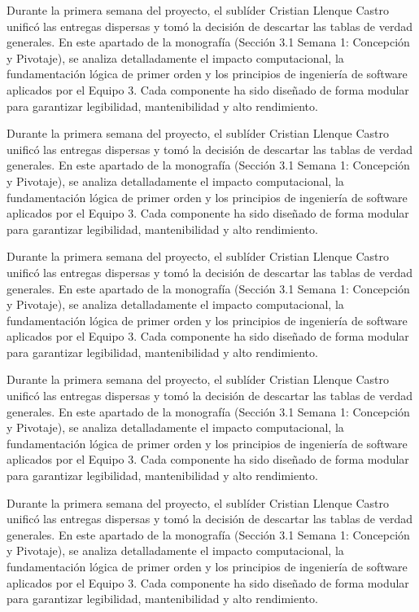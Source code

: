 \documentclass[11pt,a4paper]{article}
\begin{document}
Durante la primera semana del proyecto, el sublíder Cristian Llenque
Castro unificó las entregas dispersas y tomó la decisión de descartar
las tablas de verdad generales. En este apartado de la monografía
(Sección 3.1 Semana 1: Concepción y Pivotaje), se analiza detalladamente
el impacto computacional, la fundamentación lógica de primer orden y los
principios de ingeniería de software aplicados por el Equipo 3. Cada
componente ha sido diseñado de forma modular para garantizar
legibilidad, mantenibilidad y alto rendimiento.

Durante la primera semana del proyecto, el sublíder Cristian Llenque
Castro unificó las entregas dispersas y tomó la decisión de descartar
las tablas de verdad generales. En este apartado de la monografía
(Sección 3.1 Semana 1: Concepción y Pivotaje), se analiza detalladamente
el impacto computacional, la fundamentación lógica de primer orden y los
principios de ingeniería de software aplicados por el Equipo 3. Cada
componente ha sido diseñado de forma modular para garantizar
legibilidad, mantenibilidad y alto rendimiento.

Durante la primera semana del proyecto, el sublíder Cristian Llenque
Castro unificó las entregas dispersas y tomó la decisión de descartar
las tablas de verdad generales. En este apartado de la monografía
(Sección 3.1 Semana 1: Concepción y Pivotaje), se analiza detalladamente
el impacto computacional, la fundamentación lógica de primer orden y los
principios de ingeniería de software aplicados por el Equipo 3. Cada
componente ha sido diseñado de forma modular para garantizar
legibilidad, mantenibilidad y alto rendimiento.

Durante la primera semana del proyecto, el sublíder Cristian Llenque
Castro unificó las entregas dispersas y tomó la decisión de descartar
las tablas de verdad generales. En este apartado de la monografía
(Sección 3.1 Semana 1: Concepción y Pivotaje), se analiza detalladamente
el impacto computacional, la fundamentación lógica de primer orden y los
principios de ingeniería de software aplicados por el Equipo 3. Cada
componente ha sido diseñado de forma modular para garantizar
legibilidad, mantenibilidad y alto rendimiento.

Durante la primera semana del proyecto, el sublíder Cristian Llenque
Castro unificó las entregas dispersas y tomó la decisión de descartar
las tablas de verdad generales. En este apartado de la monografía
(Sección 3.1 Semana 1: Concepción y Pivotaje), se analiza detalladamente
el impacto computacional, la fundamentación lógica de primer orden y los
principios de ingeniería de software aplicados por el Equipo 3. Cada
componente ha sido diseñado de forma modular para garantizar
legibilidad, mantenibilidad y alto rendimiento.
\end{document}
